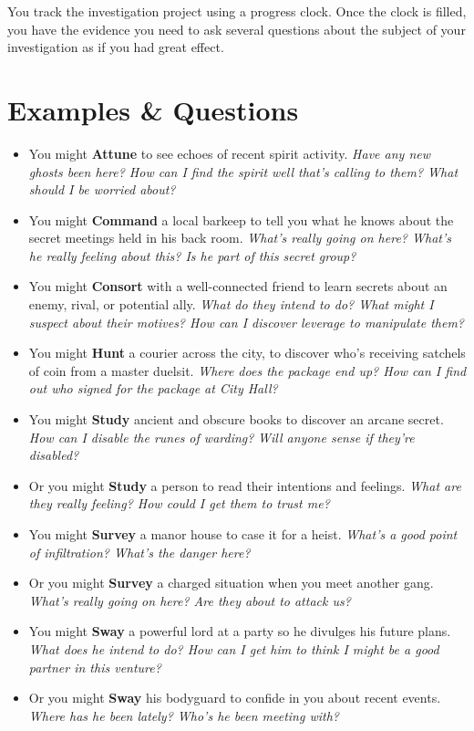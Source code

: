 \documentclass[11pt,fleqn,a5paper]{book}
\newcommand{\gameterm}[1]{\textbf{#1}}
\begin{document}
You track the investigation project using a progress clock. Once the clock is filled, you have the evidence you need to ask several questions about the subject of your investigation as if you had great effect.

\section{Examples \& Questions}

\begin{itemize}
	\item You might \gameterm{Attune}  to see echoes of recent spirit activity. \emph{Have any new ghosts been here? How can I find the spirit well that’s calling to them? What should I be worried about?}
	\item You might \gameterm{Command}  a local barkeep to tell you what he knows about the secret meetings held in his back room. \emph{What’s really going on here? What’s he really feeling about this? Is he part of this secret group?}
	\item You might \gameterm{Consort}  with a well-connected friend to learn secrets about an enemy, rival, or potential ally. \emph{What do they intend to do? What might I suspect about their motives? How can I discover leverage to manipulate them?}
	\item You might \gameterm{Hunt}  a courier across the city, to discover who’s receiving satchels of coin from a master duelsit. \emph{Where does the package end up? How can I find out who signed for the package at City Hall?}
	\item You might \gameterm{Study}  ancient and obscure books to discover an arcane secret. \emph{How can I disable the runes of warding? }\emph{Will anyone sense if they’re disabled?}
	\item Or you might \gameterm{Study}  a person to read their intentions and feelings. \emph{What are they really feeling? How could I get them to trust me?}
	\item You might \gameterm{Survey}  a manor house to case it for a heist. \emph{What’s a good point of infiltration? What’s the danger here?}
	\item Or you might \gameterm{Survey}  a charged situation when you meet another gang. \emph{What’s really going on here? Are they about to attack us?}
	\item You might \gameterm{Sway}  a powerful lord at a party so he divulges his future plans. \emph{What does he intend to do? How can I get him to think I might be a good partner in this venture?}
	\item Or you might \gameterm{Sway}  his bodyguard to confide in you about recent events. \emph{Where has he been lately? Who’s he been meeting with?}
\end{itemize}
\end{document}

